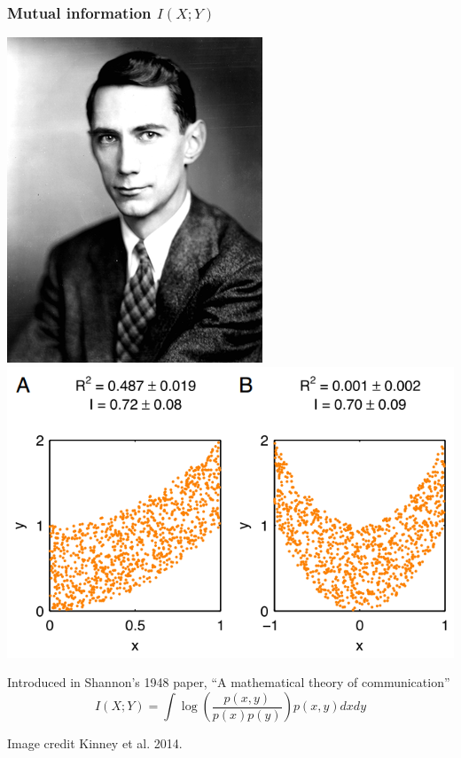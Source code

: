 \documentclass{beamer}
\begin{document}
\begin{frame}
\frametitle{Mutual information $I(X; Y)$}
\begin{center}
\includegraphics[scale = 0.23]{shannon_claude.png}
\hspace{0.2in}
\includegraphics[scale = 0.2]{kinney2.png}
\end{center}
Introduced in Shannon's 1948 paper, ``A mathematical theory of communication''
\[
I(X; Y) = \int \log \left(\frac{p(x, y)}{p(x)p(y)}\right) p(x, y) dx dy
\]

\vspace{0.2in}
\tiny{Image credit Kinney et al. 2014.}
\end{frame}
\end{document}
